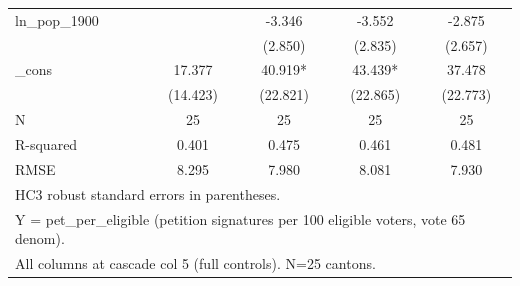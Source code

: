 \begin{table}[htbp]
\begin{tabular}{l*{4}{c}}
ln\_pop\_1900 &               &      -3.346   &      -3.552   &      -2.875   \\
            &               &     (2.850)   &     (2.835)   &     (2.657)   \\
\_cons      &      17.377   &      40.919*  &      43.439*  &      37.478   \\
            &    (14.423)   &    (22.821)   &    (22.865)   &    (22.773)   \\
\midrule
N           &          25   &          25   &          25   &          25   \\
R-squared   &       0.401   &       0.475   &       0.461   &       0.481   \\
RMSE        &       8.295   &       7.980   &       8.081   &       7.930   \\
\bottomrule
\multicolumn{5}{l}{\footnotesize HC3 robust standard errors in parentheses.}\\
\multicolumn{5}{l}{\footnotesize Y = pet\_per\_eligible (petition signatures per 100 eligible voters, vote 65 denom).}\\
\multicolumn{5}{l}{\footnotesize All columns at cascade col 5 (full controls). N=25 cantons.}\\
\end{tabular}
\end{table}
